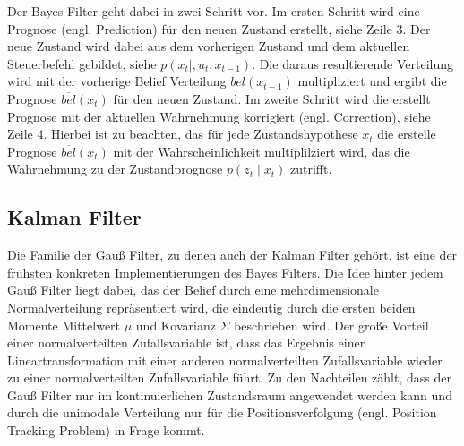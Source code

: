 Der Bayes Filter geht dabei in zwei Schritt vor. Im ersten Schritt wird eine Prognose (engl. Prediction) für den neuen Zustand erstellt, siehe Zeile 3. Der neue Zustand wird dabei aus dem vorherigen Zustand und dem aktuellen Steuerbefehl gebildet, siehe $p(x_t \mid, u_t, x_{t-1})$. Die daraus resultierende Verteilung wird mit der vorherige Belief Verteilung $bel(x_{t-1})$ multipliziert und ergibt die Prognose $\overline{bel}(x_t)$ für den neuen Zustand. Im zweite Schritt wird die erstellt Prognose mit der aktuellen Wahrnehmung korrigiert (engl. Correction), siehe Zeile 4. Hierbei ist zu beachten, das für jede Zustandshypothese $x_t$ die erstelle Prognose $\overline{bel}(x_t)$ mit der Wahrscheinlichkeit multiplilziert wird, das die Wahrnehmung zu der Zustandprognose $p(z_t \mid x_t)$ zutrifft.


%
%
\subsection{Kalman Filter}

Die Familie der Gauß Filter, zu denen auch der Kalman Filter gehört, ist eine der frühsten konkreten Implementierungen des Bayes Filters. Die Idee hinter jedem Gauß Filter liegt dabei, das der Belief durch eine mehrdimensionale Normalverteilung repräsentiert wird, die eindeutig durch die ersten beiden Momente Mittelwert $\mu$ und Kovarianz $\Sigma$ beschrieben wird. Der große Vorteil einer normalverteilten Zufallsvariable ist, dass das Ergebnis einer Lineartransformation mit einer anderen normalverteilten Zufallsvariable wieder zu einer normalverteilten Zufallsvariable führt. Zu den Nachteilen zählt, dass der Gauß Filter nur im kontinuierlichen Zustandsraum angewendet werden kann und durch die unimodale Verteilung nur für die Positionsverfolgung (engl. Position Tracking Problem) in Frage kommt.

